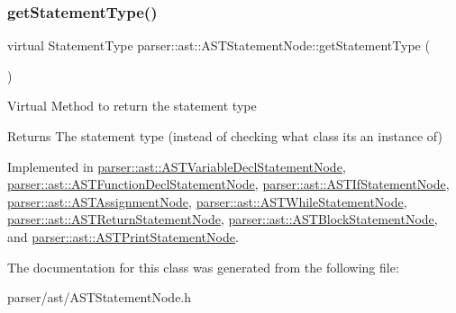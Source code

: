 \subsubsection{\texorpdfstring{get\+Statement\+Type()}{getStatementType()}}
{\footnotesize\ttfamily virtual Statement\+Type parser\+::ast\+::\+A\+S\+T\+Statement\+Node\+::get\+Statement\+Type (\begin{DoxyParamCaption}{ }\end{DoxyParamCaption})\hspace{0.3cm}{\ttfamily [pure virtual]}}

Virtual Method to return the statement type \begin{DoxyReturn}{Returns}
The statement type (instead of checking what class it\textquotesingle{}s an instance of) 
\end{DoxyReturn}


Implemented in \hyperlink{classparser_1_1ast_1_1ASTVariableDeclStatementNode_a273b2c22a426022608813603ddfd820b}{parser\+::ast\+::\+A\+S\+T\+Variable\+Decl\+Statement\+Node}, \hyperlink{classparser_1_1ast_1_1ASTFunctionDeclStatementNode_af951f3f6b2b47831a252bafe3dcb2a1f}{parser\+::ast\+::\+A\+S\+T\+Function\+Decl\+Statement\+Node}, \hyperlink{classparser_1_1ast_1_1ASTIfStatementNode_aebe9139e5ee81c851aa01fd292635562}{parser\+::ast\+::\+A\+S\+T\+If\+Statement\+Node}, \hyperlink{classparser_1_1ast_1_1ASTAssignmentNode_ad53e33c7aa72d26b67e38699bdac2e32}{parser\+::ast\+::\+A\+S\+T\+Assignment\+Node}, \hyperlink{classparser_1_1ast_1_1ASTWhileStatementNode_a47ad4212e8bae1bbe602918044e39cd8}{parser\+::ast\+::\+A\+S\+T\+While\+Statement\+Node}, \hyperlink{classparser_1_1ast_1_1ASTReturnStatementNode_a8e1fdae4c10f1e3349b244914e5117be}{parser\+::ast\+::\+A\+S\+T\+Return\+Statement\+Node}, \hyperlink{classparser_1_1ast_1_1ASTBlockStatementNode_aec80a6d582f0b9691dbd33d0d5ecb975}{parser\+::ast\+::\+A\+S\+T\+Block\+Statement\+Node}, and \hyperlink{classparser_1_1ast_1_1ASTPrintStatementNode_a9526c5de33100e05f1ccba710c0a9a34}{parser\+::ast\+::\+A\+S\+T\+Print\+Statement\+Node}.



The documentation for this class was generated from the following file\+:\begin{DoxyCompactItemize}
\item 
parser/ast/A\+S\+T\+Statement\+Node.\+h\end{DoxyCompactItemize}
